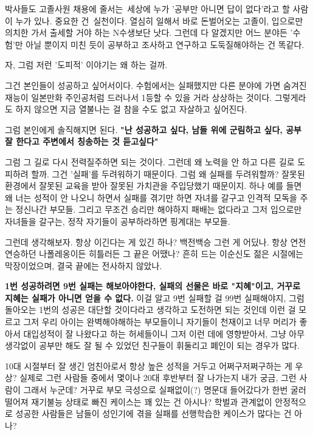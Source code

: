 박사들도 고졸사원 채용에 줄서는 세상에 누가 '공부만 아니면 답이 없다'라고 할 사람이 누가 있나.
중요한 건 실천이다. 열심히 일해서 바로 돈벌어오는 고졸이, 입으로만 의치한 가서 출세할 거야 하는 N수생보단 낫다.
그런데 다 알겠지만 어느 분야든 '수험'만 아닐 뿐이지 미친 듯이 공부하고 조사하고 연구하고 도둑질해야하는 건 똑같다.
\vspace{5mm}

자, 그럼 저런 '도피적' 이야기는 왜 하는 걸까.
\vspace{5mm}

그건 본인들이 성공하고 싶어서이다.
수험에서는 실패했지만 다른 분야에 가면 숨겨진 재능이 일본만화 주인공처럼 드러나서 1등할 수 있을 거라 상상하는 것이다.
그렇게라도 하지 않으면 지금 열불나는 걸 참을 수도 없고 자살하고 싶어진다.
\vspace{5mm}

그럼 본인에게 솔직해지면 된다.
\textbf{"난 성공하고 싶다, 남들 위에 군림하고 싶다, 공부 잘 한다고 주변에서 칭송하는 것 듣고싶다"}
\vspace{5mm}

그럼 그 길로 다시 전력질주하면 되는 것이다.
그런데 왜 노력을 안 하고 다른 길로 도피하려 할까.
그건 '실패'를 두려워하기 때문이다.
그럼 왜 실패를 두려워할까?
잘못된 환경에서 잘못된 교육을 받아 잘못된 가치관을 주입당했기 때문이지.
하나 예를 들면 왜 너는 성적이 안 나오니 하면서 실패를 겪기만 하면 자녀를 갈구고 인격적 모독을 주는 정신나간 부모들.
그리고 무조건 승리만 해야하지 패배는 없다라고 그저 입으로만 자녀들을 갈구는, 정작 자기들이 공부하라하면 핑계대는 부모들.
\vspace{5mm}

그런데 생각해보자. 항상 이긴다는 게 있긴 하나? 백전백승 그런 게 어딨나.
항상 연전연승하던 나폴레옹이든 히틀러든 그 끝은 어땠나?
흔히 드는 이순신도 젊은 시절에는 막장이었으며, 결국 끝에는 전사하지 않았나.
\vspace{5mm}

\textbf{1번 성공하려면 9번 실패는 해보아야한다, 실패의 선물은 바로 "지혜"이고, 거꾸로 지혜는 실패가 아니면 얻을 수 없다.}
이걸 알고 9번 실패할 걸 99번 실패해야지, 그럼 돌아오는 1번의 성공은 대단할 것이다라고 생각하고 도전하면 되는 것인데
이런 걸 모르고 그저 우리 아이는 완벽해야해하는 부모들이니
자기들이 천재이고 너무 머리가 좋아서 대입성적이 잘 나왔다고 하는 허세들이니
그저 이런 데에 영향받아서, 그냥 아무 생각없이 공부만 해도 잘 될 수 있었던 친구들이 휘둘리고 폐인이 되는 경우가 많다.
\vspace{5mm}

10대 시절부터 잘 생긴 엄친아로서 항상 높은 성적을 거두고 어쩌구저쩌구하는 게 우상?
실제로 그런 사람들 중에서 몇이나 20대 후반부터 잘 나가는지 내가 궁금, 그런 사람이 그래서 누군데?
거꾸로 부모 극성으로 실패없이(?) 명문대 들어갔다가 한번 굴러떨어져 재기불능 상태로 빠진 케이스는 꽤 있는 건 아시나?
학벌과 관계없이 안정적으로 성공한 사람들은 남들이 성인기에 겪을 실패를 선행학습한 케이스가 많다는 건 아나?
\vspace{5mm}

